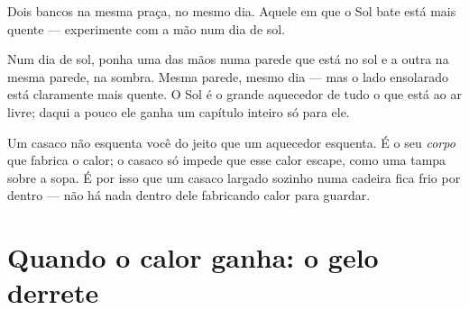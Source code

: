 \begin{omfigure}

{\small Dois bancos na mesma praça, no mesmo dia. Aquele em que o Sol
bate está mais quente --- experimente com a mão num dia de sol.}
\end{omfigure}

\begin{example}\label{ex:g1:hot-and-cold:sunshade}
Num dia de sol, ponha uma das mãos numa parede que está no sol e a
outra na mesma parede, na sombra. Mesma parede, mesmo dia --- mas o
lado ensolarado está claramente mais quente. O Sol é o grande
aquecedor de tudo o que está ao ar livre; daqui a pouco ele ganha um
capítulo inteiro só para ele.
\end{example}

\begin{remark}\label{rem:g1:hot-and-cold:coat}
Um casaco não esquenta você do jeito que um aquecedor esquenta. É o
seu \emph{corpo} que fabrica o calor; o casaco só impede que esse
calor escape, como uma tampa sobre a sopa. É por isso que um casaco
largado sozinho numa cadeira fica frio por dentro --- não há nada
dentro dele fabricando calor para guardar.
\end{remark}

\section{Quando o calor ganha: o gelo derrete}

